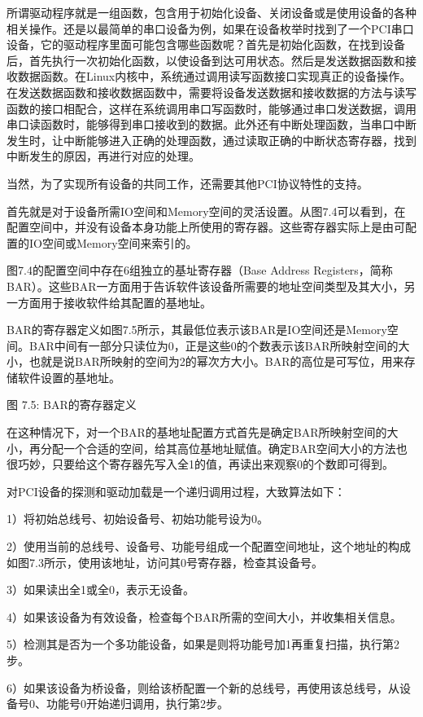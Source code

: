\documentclass[]{ctexbook}
\begin{document}
所谓驱动程序就是一组函数，包含用于初始化设备、关闭设备或是使用设备的各种相关操作。还是以最简单的串口设备为例，如果在设备枚举时找到了一个PCI串口设备，它的驱动程序里面可能包含哪些函数呢？首先是初始化函数，在找到设备后，首先执行一次初始化函数，以使设备到达可用状态。然后是发送数据函数和接收数据函数。在Linux内核中，系统通过调用读写函数接口实现真正的设备操作。在发送数据函数和接收数据函数中，需要将设备发送数据和接收数据的方法与读写函数的接口相配合，这样在系统调用串口写函数时，能够通过串口发送数据，调用串口读函数时，能够得到串口接收到的数据。此外还有中断处理函数，当串口中断发生时，让中断能够进入正确的处理函数，通过读取正确的中断状态寄存器，找到中断发生的原因，再进行对应的处理。

当然，为了实现所有设备的共同工作，还需要其他PCI协议特性的支持。

首先就是对于设备所需IO空间和Memory空间的灵活设置。从图7.4可以看到，在配置空间中，并没有设备本身功能上所使用的寄存器。这些寄存器实际上是由可配置的IO空间或Memory空间来索引的。

图7.4的配置空间中存在6组独立的基址寄存器（Base Address Registers，简称BAR）。这些BAR一方面用于告诉软件该设备所需要的地址空间类型及其大小，另一方面用于接收软件给其配置的基地址。

BAR的寄存器定义如图7.5所示，其最低位表示该BAR是IO空间还是Memory空间。BAR中间有一部分只读位为0，正是这些0的个数表示该BAR所映射空间的大小，也就是说BAR所映射的空间为2的幂次方大小。BAR的高位是可写位，用来存储软件设置的基地址。

图 7.5: BAR的寄存器定义

在这种情况下，对一个BAR的基地址配置方式首先是确定BAR所映射空间的大小，再分配一个合适的空间，给其高位基地址赋值。确定BAR空间大小的方法也很巧妙，只要给这个寄存器先写入全1的值，再读出来观察0的个数即可得到。

对PCI设备的探测和驱动加载是一个递归调用过程，大致算法如下：

1）将初始总线号、初始设备号、初始功能号设为0。

2）使用当前的总线号、设备号、功能号组成一个配置空间地址，这个地址的构成如图7.3所示，使用该地址，访问其0号寄存器，检查其设备号。

3）如果读出全1或全0，表示无设备。

4）如果该设备为有效设备，检查每个BAR所需的空间大小，并收集相关信息。

5）检测其是否为一个多功能设备，如果是则将功能号加1再重复扫描，执行第2步。

6）如果该设备为桥设备，则给该桥配置一个新的总线号，再使用该总线号，从设备号0、功能号0开始递归调用，执行第2步。
\end{document}

